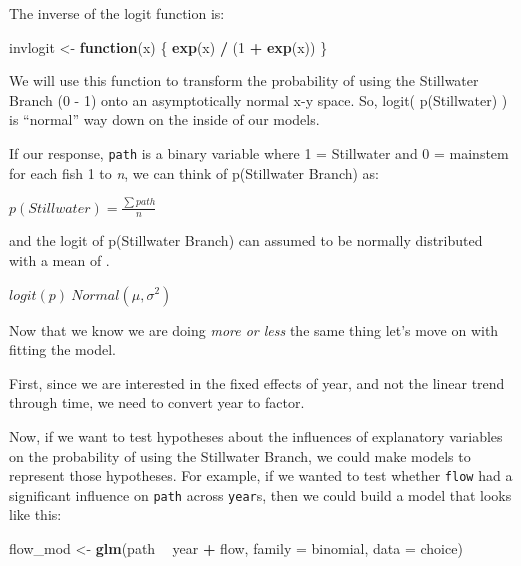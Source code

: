 \documentclass[
]{book}
\newenvironment{Shaded}{\begin{snugshade}}{\end{snugshade}}
\newcommand{\ControlFlowTok}[1]{\textcolor[rgb]{0.13,0.29,0.53}{\textbf{#1}}}
\newcommand{\DataTypeTok}[1]{\textcolor[rgb]{0.13,0.29,0.53}{#1}}
\newcommand{\DecValTok}[1]{\textcolor[rgb]{0.00,0.00,0.81}{#1}}
\newcommand{\KeywordTok}[1]{\textcolor[rgb]{0.13,0.29,0.53}{\textbf{#1}}}
\newcommand{\NormalTok}[1]{#1}
\newcommand{\OperatorTok}[1]{\textcolor[rgb]{0.81,0.36,0.00}{\textbf{#1}}}
\newcommand{\StringTok}[1]{\textcolor[rgb]{0.31,0.60,0.02}{#1}}
\begin{document}
The inverse of the logit function is:

\begin{Shaded}
\begin{Highlighting}[]
\NormalTok{invlogit <-}\StringTok{ }\ControlFlowTok{function}\NormalTok{(x) \{}
  \KeywordTok{exp}\NormalTok{(x) }\OperatorTok{/}\StringTok{ }\NormalTok{(}\DecValTok{1} \OperatorTok{+}\StringTok{ }\KeywordTok{exp}\NormalTok{(x))}
\NormalTok{\}}
\end{Highlighting}
\end{Shaded}

We will use this function to transform the probability of using the Stillwater Branch (0 - 1) onto an asymptotically normal x-y space. So, logit( p(Stillwater) ) is ``normal'' way down on the inside of our models.

If our response, \texttt{path} is a binary variable where 1 = Stillwater and 0 = mainstem for each fish 1 to \emph{n}, we can think of p(Stillwater Branch) as:

\(p(Stillwater) = \frac{\sum{path}}{n}\)

and the logit of p(Stillwater Branch) can assumed to be normally distributed with a mean of \mu.

\(logit(p) ~ Normal(\mu, \sigma^{2})\)

Now that we know we are doing \emph{more or less} the same thing let's move on with fitting the model.

First, since we are interested in the fixed effects of year, and not the linear trend through time, we need to convert year to factor.

\begin{Shaded}
\end{Shaded}

Now, if we want to test hypotheses about the influences of explanatory variables on the probability of using the Stillwater Branch, we could make models to represent those hypotheses. For example, if we wanted to test whether \texttt{flow} had a significant influence on \texttt{path} across \texttt{year}s, then we could build a model that looks like this:

\begin{Shaded}
\begin{Highlighting}[]
\NormalTok{flow_mod <-}\StringTok{ }\KeywordTok{glm}\NormalTok{(path }\OperatorTok{~}\StringTok{ }\NormalTok{year }\OperatorTok{+}\StringTok{ }\NormalTok{flow, }\DataTypeTok{family =}\NormalTok{ binomial, }\DataTypeTok{data =}\NormalTok{ choice)}
\end{Highlighting}
\end{Shaded}
\end{document}
